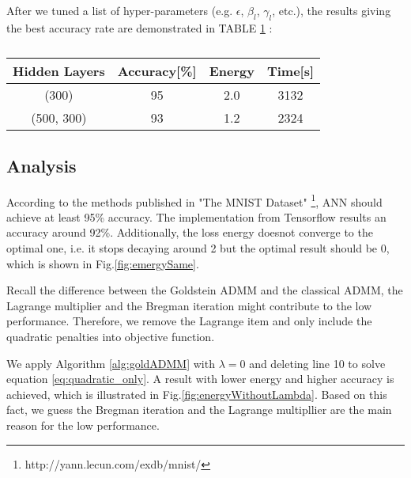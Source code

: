 \documentclass[letterpaper, 10 pt, conference]{ieeeconf}  %
\begin{document}
After we tuned a list of hyper-parameters (e.g. $\epsilon$, $\beta_l$, $\gamma_l$, etc.), the results giving the best accuracy rate are demonstrated in TABLE \ref{tab:res1}
:
\begin{table}[h]
\centering
\caption{}
\begin{tabular}{c|c|c|c|}
\hline
		Hidden Layers & Accuracy[\%] & Energy &Time[s]\\
\hline
		(300) & 95 & 2.0 & 3132\\
		(500, 300) & 93 & 1.2 & 2324 \\
\hline
\end{tabular}
\label{tab:res1}
\end{table}

\subsection{Analysis}
According to the methods published in "The MNIST Dataset" \footnote{http://yann.lecun.com/exdb/mnist/}, ANN should achieve at least 95\% accuracy. The implementation from Tensorflow results an accuracy around 92\%. Additionally, the loss energy doesnot converge to the optimal one, i.e. it stops decaying around 2 but the optimal result should be 0, which is shown in Fig.\ref{fig:emergySame}.

Recall the difference between the Goldstein ADMM and the classical ADMM, the Lagrange multiplier and the Bregman iteration might contribute to the low performance. Therefore, we remove the Lagrange item and only include the quadratic penalties into objective function.

We apply Algorithm \ref{alg:goldADMM} with $\lambda=0$ and deleting line 10 to solve equation \eqref{eq:quadratic_only}. A result with lower energy and higher accuracy is achieved, which is illustrated in Fig.\ref{fig:energyWithoutLambda}. Based on this fact, we guess the Bregman iteration and the Lagrange multipllier are the main reason for the low performance.
\end{document}

